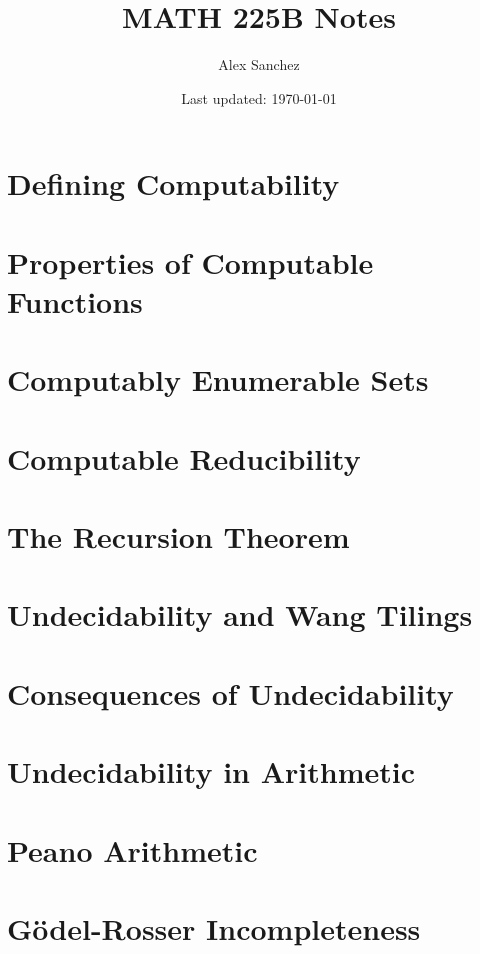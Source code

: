 \documentclass{book}
\title{MATH 225B Notes}
\author{Alex Sanchez}
\date{Last updated: \today}
\begin{document}
\maketitle

\chapter{Defining Computability}




\chapter{Properties of Computable Functions}



\chapter{Computably Enumerable Sets}


\chapter{Computable Reducibility}


\chapter{The Recursion Theorem}

\chapter{Undecidability and Wang Tilings}

\chapter{Consequences of Undecidability}

\chapter{Undecidability in Arithmetic}

\chapter{Peano Arithmetic}

\chapter{Gödel-Rosser Incompleteness}
\end{document}
